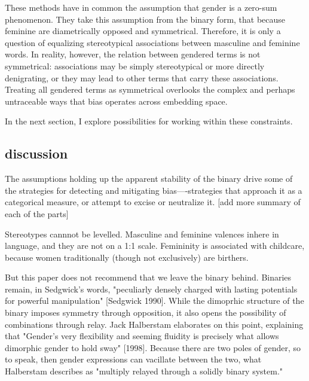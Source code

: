 \documentclass[11pt]{article}
\begin{document}
These methods have in common the assumption that gender is a zero-sum
phenomenon. They take this assumption from the binary form, that
because feminine are diametrically opposed and symmetrical. Therefore,
it is only a question of equalizing stereotypical associations between
masculine and feminine words. In reality, however, the relation
between gendered terms is not symmetrical: associations may be simply
stereotypical or more directly denigrating, or they may lead to other
terms that carry these associations. Treating all gendered terms as
symmetrical overlooks the complex and perhaps untraceable ways that
bias operates across embedding space.

In the next section, I explore possibilities for working within these
constraints.

\subsection{discussion}
\label{sec:org758b372}
The assumptions holding up the apparent stability of the binary drive
some of the strategies for detecting and mitigating bias—-strategies
that approach it as a categorical measure, or attempt to excise or
neutralize it. [add more summary of each of the parts]

Stereotypes cannnot be levelled. Masculine and feminine valences
inhere in language, and they are not on a 1:1 scale. Femininity is
associated with childcare, because women traditionally (though not
exclusively) are birthers.

But this paper does not recommend that we leave the binary behind.
Binaries remain, in Sedgwick's words, "peculiarly densely charged with
lasting potentials for powerful manipulation" [Sedgwick 1990]. While
the dimoprhic structure of the binary imposes symmetry through
opposition, it also opens the possibility of combinations through
relay. Jack Halberstam elaborates on this point, explaining that
"Gender's very flexibility and seeming fluidity is precisely what
allows dimorphic gender to hold sway" [1998]. Because there are two
poles of gender, so to speak, then gender expressions can vacillate
between the two, what Halberstam describes as "multiply relayed
through a solidly binary system."
\end{document}
